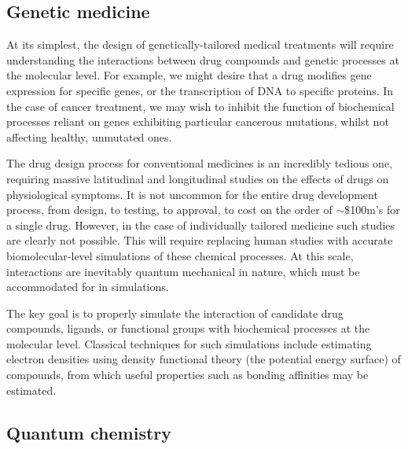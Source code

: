 %
%

\subsection{Genetic medicine}

At its simplest, the design of genetically-tailored medical treatments will require understanding the interactions between drug compounds and genetic processes at the molecular level. For example, we might desire that a drug modifies gene expression for specific genes, or the transcription of DNA to specific proteins. In the case of cancer treatment, we may wish to inhibit the function of biochemical processes reliant on genes exhibiting particular cancerous mutations, whilst not affecting healthy, unmutated ones.

The drug design process for conventional medicines is an incredibly tedious one, requiring massive latitudinal and longitudinal studies on the effects of drugs on physiological symptoms. It is not uncommon for the entire drug development process, from design, to testing, to approval, to cost on the order of $\sim$\$100m's for a single drug. However, in the case of individually tailored medicine such studies are clearly not possible. This will require replacing human studies with accurate biomolecular-level simulations of these chemical processes. At this scale, interactions are inevitably quantum mechanical in nature, which must be accommodated for in simulations.

The key goal is to properly simulate the interaction of candidate drug compounds, ligands, or functional groups with biochemical processes at the molecular level. Classical techniques for such simulations include estimating electron densities using density functional theory (the potential energy surface) of compounds, from which useful properties such as bonding affinities may be estimated.

%
%

\subsection{Quantum chemistry}

